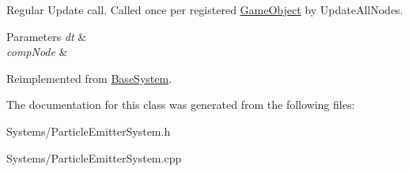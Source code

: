 Regular Update call. Called once per registered \hyperlink{classGameObject}{Game\+Object} by Update\+All\+Nodes. 


\begin{DoxyParams}{Parameters}
{\em dt} & \\
\hline
{\em comp\+Node} & \\
\hline
\end{DoxyParams}


Reimplemented from \hyperlink{classBaseSystem_a465191589a1ef8b8f3a8e20fa4656d47}{Base\+System}.



The documentation for this class was generated from the following files\+:\begin{DoxyCompactItemize}
\item 
Systems/Particle\+Emitter\+System.\+h\item 
Systems/Particle\+Emitter\+System.\+cpp\end{DoxyCompactItemize}
